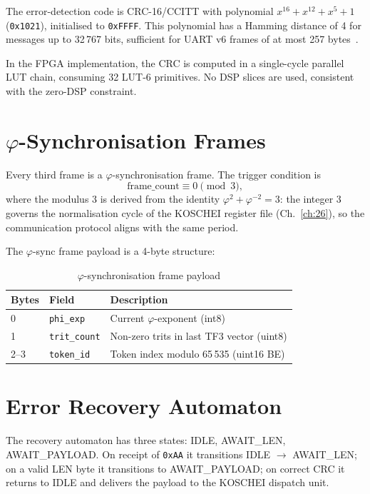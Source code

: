 The error-detection code is CRC-16/CCITT with polynomial $x^{16} + x^{12} + x^5 + 1$ (\texttt{0x1021}), initialised to \texttt{0xFFFF}. This polynomial has a Hamming distance of 4 for messages up to 32\,767 bits, sufficient for UART v6 frames of at most 257 bytes~\cite{peterson_brown_1961}.

In the FPGA implementation, the CRC is computed in a single-cycle parallel LUT chain, consuming 32 LUT-6 primitives. No DSP slices are used, consistent with the zero-DSP constraint.

\section{$\varphi$-Synchronisation Frames}

Every third frame is a $\varphi$-synchronisation frame. The trigger condition is
\begin{equation}
\text{frame\_count} \equiv 0 \pmod{3},
\end{equation}
where the modulus 3 is derived from the identity $\varphi^2 + \varphi^{-2} = 3$: the integer 3 governs the normalisation cycle of the KOSCHEI register file (Ch.~\ref{ch:26}), so the communication protocol aligns with the same period.

The $\varphi$-sync frame payload is a 4-byte structure:

\begin{table}[h]
\centering
\caption{$\varphi$-synchronisation frame payload}
\begin{tabular}{lll}
\toprule
\textbf{Bytes} & \textbf{Field} & \textbf{Description} \\
\midrule
0   & \texttt{phi\_exp}   & Current $\varphi$-exponent (int8) \\
1   & \texttt{trit\_count} & Non-zero trits in last TF3 vector (uint8) \\
2--3 & \texttt{token\_id}  & Token index modulo 65\,535 (uint16 BE) \\
\bottomrule
\end{tabular}
\end{table}

\section{Error Recovery Automaton}

The recovery automaton has three states: IDLE, AWAIT\_LEN, AWAIT\_PAYLOAD. On receipt of \texttt{0xAA} it transitions IDLE $\to$ AWAIT\_LEN; on a valid LEN byte it transitions to AWAIT\_PAYLOAD; on correct CRC it returns to IDLE and delivers the payload to the KOSCHEI dispatch unit.

